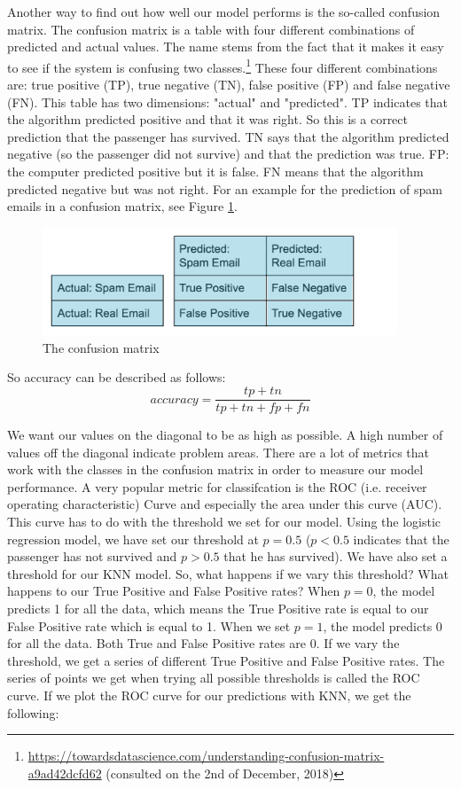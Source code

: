 \documentclass[11pt]{article}
\begin{document}
Another way to find out how well our model performs is the so-called confusion matrix. The confusion matrix is a table with four different combinations of predicted and actual values. The name stems from the fact that it makes it easy to see if the system is confusing two classes.\footnote{\url{https://towardsdatascience.com/understanding-confusion-matrix-a9ad42dcfd62} (consulted on the 2nd of December, 2018)} These four different combinations are: true positive (TP), true negative (TN), false positive (FP) and false negative (FN). This table has two dimensions: "actual" and "predicted". TP indicates that the algorithm predicted positive and that it was right. So this is a correct prediction that the passenger has survived. TN says that the algorithm predicted negative (so the passenger did not survive) and that the prediction was true. FP: the computer predicted positive but it is false. FN means that the algorithm predicted negative but was not right. For an example for the prediction of spam emails in a confusion matrix, see Figure \ref{tab:matrix}. 
\begin{figure}[htbp]
\centering
\includegraphics[width=400]{./CONFUSIONMATRIX.png}
\caption{\label{tab:matrix}
The confusion matrix}
\end{figure}

So accuracy can be described as follows: 
\begin{equation}
accuracy = \frac{tp+tn}{tp+tn+fp+fn}
\end{equation}

We want our values on the diagonal to be as high as possible. A high number of values off the diagonal indicate problem areas. There are a lot of metrics that work with the classes in the confusion matrix in order to measure our model performance. A very popular metric for classifcation is the ROC (i.e. receiver operating characteristic) Curve and especially the area under this curve (AUC). This curve has to do with the threshold we set for our model. Using the logistic regression model, we have set our threshold at \(p=0.5\) (\(p<0.5\) indicates that the passenger has not survived and \(p>0.5\) that he has survived). We have also set a threshold for our KNN model. So, what happens if we vary this threshold? What happens to our True Positive and False Positive rates? When \(p=0\), the model predicts 1 for all the data, which means the True Positive rate is equal to our False Positive rate which is equal to 1. When we set \(p=1\), the model predicts 0 for all the data. Both True and False Positive rates are 0. If we vary the threshold, we get a series of different True Positive and False Positive rates. The series of points we get when trying all possible thresholds is called the ROC curve. If we plot the ROC curve for our predictions with KNN, we get the following: 
\end{document}

